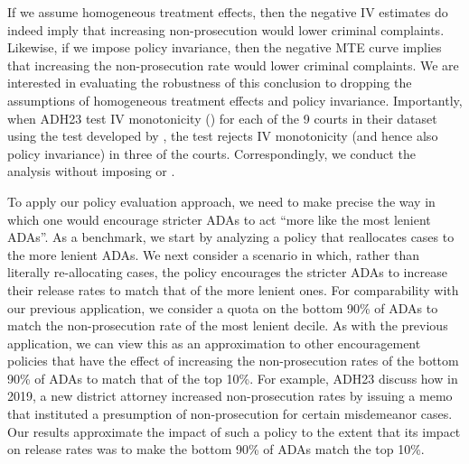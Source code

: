 \documentclass[12pt]{article}%
\theoremstyle{definition}
\newcommand\1{\operatorname{I}\indicatorfence}
\begin{document}
If we assume homogeneous treatment effects, then the negative IV estimates do
indeed imply that increasing non-prosecution would lower criminal complaints. Likewise, if we impose policy invariance, then the negative MTE curve implies that increasing the non-prosecution rate would lower criminal complaints. We are interested in evaluating the
robustness of this conclusion to dropping the assumptions of homogeneous treatment effects and policy invariance. Importantly, when ADH23 test IV monotonicity
() for each of the 9 courts in their
dataset using the test developed by \textcite{fll23}, the test rejects
IV monotonicity (and hence also policy invariance) in three of the courts. Correspondingly, we conduct the
analysis without imposing  or
.

To apply our policy evaluation approach, we need to make precise the way in which one would encourage stricter ADAs to act ``more like the most lenient ADAs''. As a benchmark, we start by analyzing a policy that reallocates cases to the more lenient ADAs. We next consider a scenario in which, rather than literally re-allocating cases, the policy encourages the stricter ADAs to increase their release rates to match that of the more lenient ones. For comparability with our previous application, we consider a quota on the bottom 90\% of ADAs to match the
non-prosecution rate of the most lenient decile. As with the previous application, we can view this as an approximation to other encouragement policies that have the effect of increasing the non-prosecution rates of the bottom 90\% of ADAs to match that of the top 10\%. For example, ADH23 discuss how in 2019, a new district attorney increased non-prosecution rates by issuing a memo that instituted a presumption of non-prosecution for certain misdemeanor cases. Our results approximate the impact of such a policy to the extent that its impact on release rates was to make the bottom 90\% of ADAs match the top 10\%.
\end{document}
